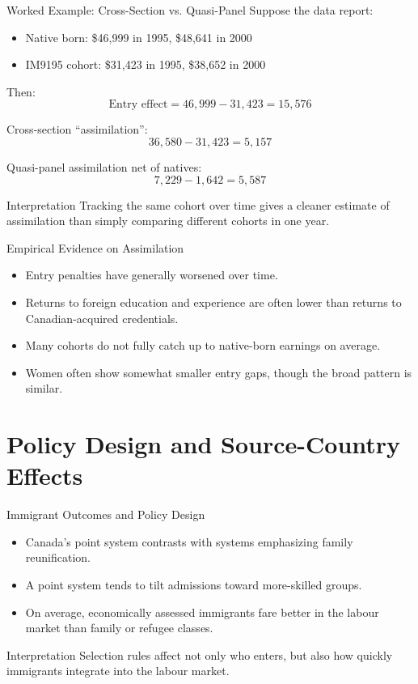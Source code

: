 \documentclass[aspectratio=169]{beamer}
\begin{document}
\begin{frame}{Worked Example: Cross-Section vs. Quasi-Panel}
\transfade
Suppose the data report:

\begin{itemize}
  \item Native born: \$46,999 in 1995, \$48,641 in 2000
  \item IM9195 cohort: \$31,423 in 1995, \$38,652 in 2000
\end{itemize}

Then:
\[
\text{Entry effect} = 46{,}999 - 31{,}423 = 15{,}576
\]

Cross-section ``assimilation'':
\[
36{,}580 - 31{,}423 = 5{,}157
\]

Quasi-panel assimilation net of natives:
\[
7{,}229 - 1{,}642 = 5{,}587
\]

\begin{block}{Interpretation}
Tracking the same cohort over time gives a cleaner estimate of assimilation than simply comparing different cohorts in one year.
\end{block}
\end{frame}

\begin{frame}{Empirical Evidence on Assimilation}
\transfade
\begin{itemize}
  \item Entry penalties have generally worsened over time.
  \item Returns to foreign education and experience are often lower than returns to Canadian-acquired credentials.
  \item Many cohorts do not fully catch up to native-born earnings on average.
  \item Women often show somewhat smaller entry gaps, though the broad pattern is similar.
\end{itemize}
\end{frame}

\section{Policy Design and Source-Country Effects}

\begin{frame}{Immigrant Outcomes and Policy Design}
\transfade
\begin{itemize}
  \item Canada's point system contrasts with systems emphasizing family reunification.
  \item A point system tends to tilt admissions toward more-skilled groups.
  \item On average, economically assessed immigrants fare better in the labour market than family or refugee classes.
\end{itemize}

\begin{block}{Interpretation}
Selection rules affect not only who enters, but also how quickly immigrants integrate into the labour market.
\end{block}
\end{frame}
\end{document}
